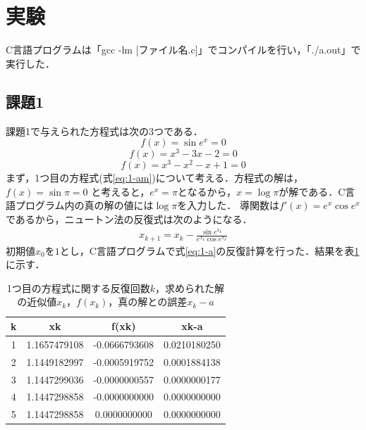 \documentclass[12pt]{jarticle}
\renewcommand  \[  {\begin{eqnarray}}
\renewcommand  \]  {\end{eqnarray}}
\begin{document}
\section{実験}
\label{sec:exp}
C言語プログラムは「gcc -lm [ファイル名.c]」でコンパイルを行い，「./a.out」で実行した．
\subsection{課題1}
課題1で与えられた方程式は次の3つである．
\begin{equation}
f(x)=\sin e^x = 0
\label{eq:1-am}
\end{equation}
\begin{equation}
f(x)=x^3-3x-2 = 0
\label{eq:1-bm}
\end{equation}
\begin{equation}
f(x)=x^3-x^2-x+1 = 0
\label{eq:1-cm}
\end{equation}
まず，1つ目の方程式(式\ref{eq:1-am})について考える．方程式の解は，$f(x)=\sin\pi=0$
と考えると，$e^x=\pi$となるから，$x=\log\pi$が解である．C言語プログラム内の真の解の値には$\log\pi$を入力した．
導関数は$f\prime(x)=e^x\cos e^x$であるから，ニュートン法の反復式は次のようになる．
\[
\label{eq:1-a}
x_{k+1}=x_k- \frac{\sin e^{x_k}}{e^{x_k}\cos e^{x_k}}
\]
初期値$x_0$を$1$とし，C言語プログラムで式\ref{eq:1-a}の反復計算を行った．結果を表\ref{tab:1-a}に示す．
\begin{table}[t]
 \caption{1つ目の方程式に関する反復回数$k$，求められた解の近似値$x_k$，$f(x_k)$，真の解との誤差\textbar $x_k-a$\textbar}
 \label{tab:1-a}
 \center
\begin{tabular}{|c|c|c|c|}
\hline
k & xk & f(xk) & xk-a\\
\hline
1  & 1.1657479108 & -0.0666793608 & 0.0210180250\\
2  & 1.1449182997 & -0.0005919752 & 0.0001884138\\
3  & 1.1447299036 & -0.0000000557 & 0.0000000177\\
4  & 1.1447298858 & -0.0000000000 & 0.0000000000\\
5  & 1.1447298858 & 0.0000000000 & 0.0000000000\\
\hline
 \end{tabular}
\end{table}
\end{document}
